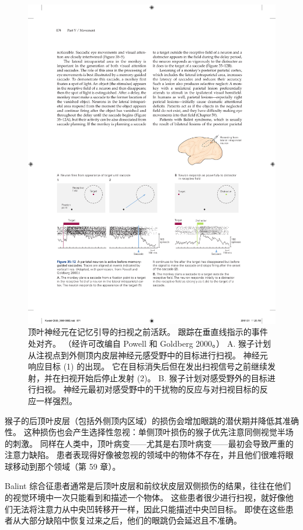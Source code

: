 \begin{figure}[htbp]
	\centering
	\includegraphics[width=0.95\linewidth]{chap35/fig_35_12}
	\caption{顶叶神经元在记忆引导的扫视之前活跃。 跟踪在垂直线指示的事件处对齐。 （经许可改编自 Powell 和 Goldberg 2000。） A. 猴子计划从注视点到外侧顶内皮层神经元感受野中的目标进行扫视。 神经元响应目标 (1) 的出现。 它在目标消失后但在发出扫视信号之前继续发射，并在扫视开始后停止发射 (2)。 B. 猴子计划对感受野外的目标进行扫视。 神经元最初对感受野中的干扰物的反应与对扫视目标的反应一样强烈。}
	\label{fig:35_12}
\end{figure}

猴子的后顶叶皮层（包括外侧顶内区域）的损伤会增加眼跳的潜伏期并降低其准确性。 这种损伤也会产生选择性忽视：单侧顶叶损伤的猴子优先注意同侧视觉半场的刺激。 同样在人类中，顶叶病变——尤其是右顶叶病变——最初会导致严重的注意力缺陷。 患者表现得好像被忽视的领域中的物体不存在，并且他们很难将眼球移动到那个领域（第 59 章）。

Balint 综合征患者通常是后顶叶皮层和前纹状皮层双侧损伤的结果，往往在他们的视觉环境中一次只能看到和描述一个物体。 这些患者很少进行扫视，就好像他们无法将注意力从中央凹转移开一样，因此只能描述中央凹目标。 即使在这些患者从大部分缺陷中恢复过来之后，他们的眼跳仍会延迟且不准确。

